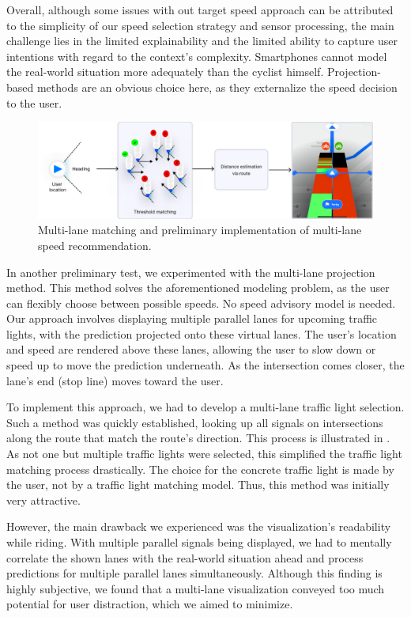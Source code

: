 Overall, although some issues with out target speed approach can be attributed to the simplicity of our speed selection strategy and sensor processing, the main challenge lies in the limited explainability and the limited ability to capture user intentions with regard to the context's complexity. Smartphones cannot model the real-world situation more adequately than the cyclist himself. Projection-based methods are an obvious choice here, as they externalize the speed decision to the user.

\begin{figure}[t]
\centering
\includegraphics[width=\linewidth]{images/multi-lane-view.png}
\caption{Multi-lane matching and preliminary implementation of multi-lane speed recommendation.}
\label{fig:multi-lane-view}
\end{figure}

In another preliminary test, we experimented with the multi-lane projection method. This method solves the aforementioned modeling problem, as the user can flexibly choose between possible speeds. No speed advisory model is needed. Our approach involves displaying multiple parallel lanes for upcoming traffic lights, with the prediction projected onto these virtual lanes. The user's location and speed are rendered above these lanes, allowing the user to slow down or speed up to move the prediction underneath. As the intersection comes closer, the lane's end (stop line) moves toward the user. 

To implement this approach, we had to develop a multi-lane traffic light selection. Such a method was quickly established, looking up all signals on intersections along the route that match the route's direction. This process is illustrated in . As not one but multiple traffic lights were selected, this simplified the traffic light matching process drastically. The choice for the concrete traffic light is made by the user, not by a traffic light matching model. Thus, this method was initially very attractive.

However, the main drawback we experienced was the visualization's readability while riding. With multiple parallel signals being displayed, we had to mentally correlate the shown lanes with the real-world situation ahead and process predictions for multiple parallel lanes simultaneously. Although this finding is highly subjective, we found that a multi-lane visualization conveyed too much potential for user distraction, which we aimed to minimize.


